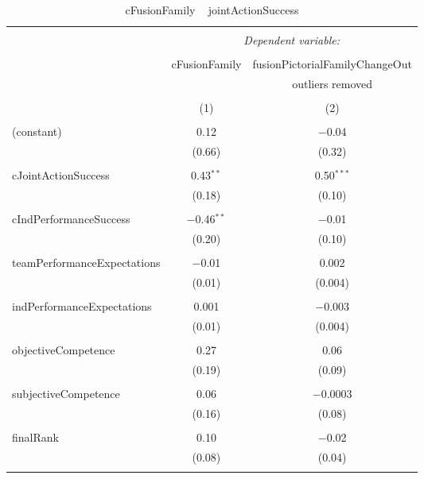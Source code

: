 
\begin{table}[!htbp] \centering 
  \caption{cFusionFamily ~ jointActionSuccess} 
  \label{tab:MLM25acFusioncJointAction} 
\footnotesize 
\begin{tabular}{@{\extracolsep{5pt}}lcc} 
\\[-1.8ex]\hline 
\hline \\[-1.8ex] 
 & \multicolumn{2}{c}{\textit{Dependent variable:}} \\ 
\cline{2-3} 
\\[-1.8ex] & cFusionFamily & fusionPictorialFamilyChangeOut \\ 
 &  & outliers removed \\ 
\\[-1.8ex] & (1) & (2)\\ 
\hline \\[-1.8ex] 
 (constant) & 0.12 & $-$0.04 \\ 
  & (0.66) & (0.32) \\ 
  & & \\ 
 cJointActionSuccess & 0.43$^{**}$ & 0.50$^{***}$ \\ 
  & (0.18) & (0.10) \\ 
  & & \\ 
 cIndPerformanceSuccess & $-$0.46$^{**}$ & $-$0.01 \\ 
  & (0.20) & (0.10) \\ 
  & & \\ 
 teamPerformanceExpectations & $-$0.01 & 0.002 \\ 
  & (0.01) & (0.004) \\ 
  & & \\ 
 indPerformanceExpectations & 0.001 & $-$0.003 \\ 
  & (0.01) & (0.004) \\ 
  & & \\ 
 objectiveCompetence & 0.27 & 0.06 \\ 
  & (0.19) & (0.09) \\ 
  & & \\ 
 subjectiveCompetence & 0.06 & $-$0.0003 \\ 
  & (0.16) & (0.08) \\ 
  & & \\ 
 finalRank & 0.10 & $-$0.02 \\ 
  & (0.08) & (0.04) \\ 
  & & \\ 

\end{tabular}
\end{table}
